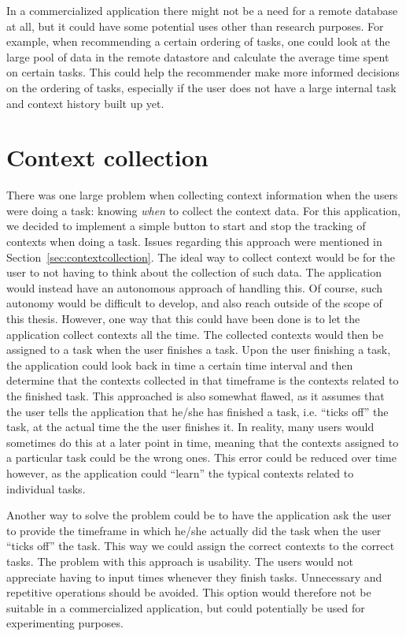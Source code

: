 In a commercialized application there might not be a need for a remote database at all, but it could have some potential uses other than research purposes. For example, when recommending a certain ordering of tasks, one could look at the large pool of data in the remote datastore and calculate the average time spent on certain tasks. This could help the recommender make more informed decisions on the ordering of tasks, especially if the user does not have a large internal task and context history built up yet.



\section{Context collection}
\label{sec:contextcollectiondiscussion}

There was one large problem when collecting context information when the users were doing a task: knowing \emph{when} to collect the context data. For this application, we decided to implement a simple button to start and stop the tracking of contexts when doing a task. Issues regarding this approach were mentioned in Section~\ref{sec:contextcollection}. The ideal way to collect context would be for the user to not having to think about the collection of such data. The application would instead have an autonomous approach of handling this. Of course, such autonomy would be difficult to develop, and also reach outside of the scope of this thesis. However, one way that this could have been done is to let the application collect contexts all the time. The collected contexts would then be assigned to a task when the user finishes a task. Upon the user finishing a task, the application could look back in time a certain time interval and then determine that the contexts collected in that timeframe is the contexts related to the finished task. This approached is also somewhat flawed, as it assumes that the user tells the application that he/she has finished a task, i.e. ``ticks off'' the task, at the actual time the the user finishes it. In reality, many users would sometimes do this at a later point in time, meaning that the contexts assigned to a particular task could be the wrong ones. This error could be reduced over time however, as the application could ``learn'' the typical contexts related to individual tasks.

Another way to solve the problem could be to have the application ask the user to provide the timeframe in which he/she actually did the task when the user ``ticks off'' the task. This way we could assign the correct contexts to the correct tasks. The problem with this approach is usability. The users would not appreciate having to input times whenever they finish tasks. Unnecessary and repetitive operations should be avoided. This option would therefore not be suitable in a commercialized application, but could potentially be used for experimenting purposes.

